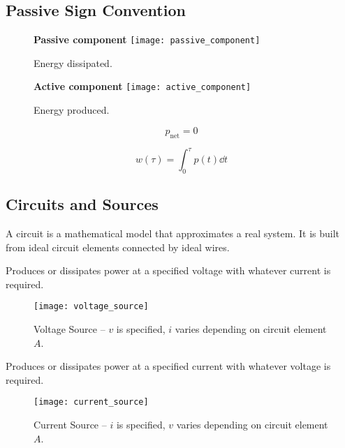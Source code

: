 \documentclass{article}
\begin{document}
\subsection{Passive Sign Convention}
\begin{figure}[H]
    \centering
    \begin{minipage}[H]{0.48\textwidth}
        \textbf{Passive component}
        \centering
        \texttt{[image: passive\_component]}
        \caption{Energy dissipated.}
    \end{minipage}\hfill
    \begin{minipage}[H]{0.48\textwidth}
        \textbf{Active component}
        \centering
        \texttt{[image: active\_component]}
        \caption{Energy produced.}
    \end{minipage}
\end{figure}
\begin{theorem}
    \begin{equation*}
        p_{\mathrm{net}} = 0
    \end{equation*}
\end{theorem}
\begin{theorem}[Energy]
    \begin{equation*}
        w\left( \tau \right) = \int_0^\tau p\left( t \right) \dd{t}
    \end{equation*}
\end{theorem}
\subsection{Circuits and Sources}
\begin{definition}[Circuits]
    A circuit is a mathematical model that approximates a real system. It is built from ideal circuit elements connected by ideal wires. 
\end{definition}
\begin{definition}
    Produces or dissipates power at a specified voltage with whatever current is required. 
\end{definition}
\begin{figure}[H]
    \centering
    \texttt{[image: voltage\_source]}
    \caption{Voltage Source -- $v$ is specified, $i$ varies depending on circuit element $A$.}
\end{figure}
\begin{definition}
    Produces or dissipates power at a specified current with whatever voltage is required. 
\end{definition}
\begin{figure}[H]
    \centering
    \texttt{[image: current\_source]}
    \caption{Current Source -- $i$ is specified, $v$ varies depending on circuit element $A$.}
\end{figure}
\end{document}
